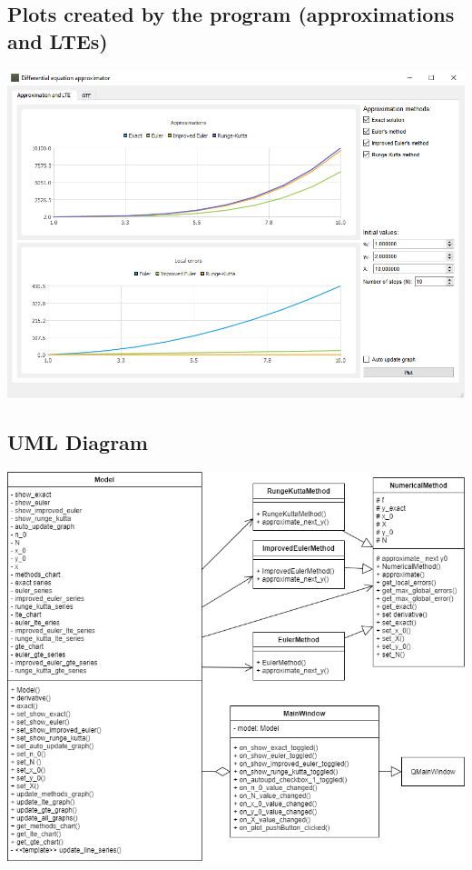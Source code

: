 \documentclass{article}
\begin{document}
\subsection{Plots created by the program (approximations and LTEs)}
\includegraphics[scale=0.5]{DiffEqMethodsAndLte.png}

\subsection{UML Diagram}
\includegraphics[scale=0.5]{DiffEqDiagram.png}
\end{document}
